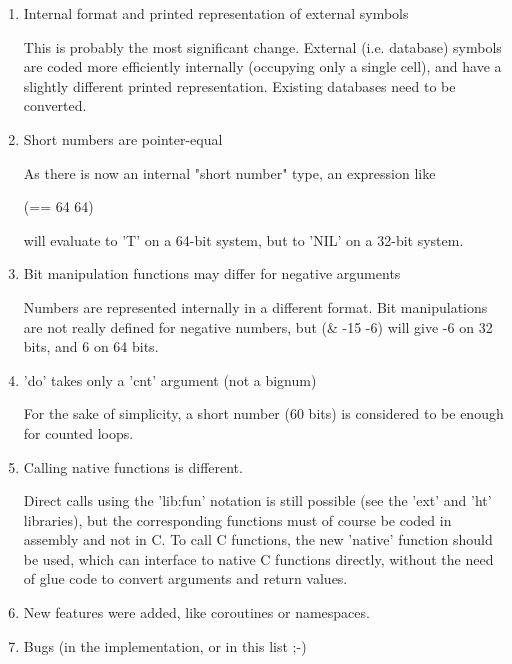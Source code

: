 \begin{enumerate}
\item  Internal format and printed representation of external symbols

   This is probably the most significant change. External (i.e. database)
   symbols are coded more efficiently internally (occupying only a single cell),
   and have a slightly different printed representation. Existing databases need
   to be converted.

\item  Short numbers are pointer-equal

   As there is now an internal "short number" type, an expression like

\begin{wideverbatim}
      (== 64 64)
\end{wideverbatim}

   will evaluate to 'T' on a 64-bit system, but to 'NIL' on a 32-bit system.

\item  Bit manipulation functions may differ for negative arguments

  Numbers are represented internally in a different format. Bit
  manipulations are not really defined for negative numbers, but (\&
  -15 -6) will give -6 on 32 bits, and 6 on 64 bits.

\item  'do' takes only a 'cnt' argument (not a bignum)

  For the sake of simplicity, a short number (60 bits) is considered
  to be enough for counted loops.

 \item  Calling native functions is different.

   Direct calls using the 'lib:fun' notation is still possible (see
   the 'ext' and 'ht' libraries), but the corresponding functions must
   of course be coded in assembly and not in C. To call C functions,
   the new 'native' function should be used, which can interface to
   native C functions directly, without the need of glue code to
   convert arguments and return values.

\item  New features were added, like coroutines or namespaces.

\item  Bugs (in the implementation, or in this list ;-)

\end{enumerate}

